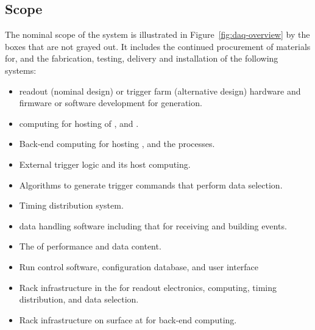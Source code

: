 \subsection{Scope}
\label{sec:fd-daq-scope}


The nominal scope of the  system is illustrated in
Figure~\ref{fig:daq-overview} by the boxes that are not grayed out. It 
includes the continued procurement of materials for, and the
fabrication, testing, delivery and installation of the following
systems:

\begin{itemize}
\item {} readout (nominal design) or trigger farm (alternative
  design) hardware and firmware or software development for
   generation.
\item {} computing for hosting of ,  and .
\item Back-end computing for hosting ,  and the  processes.
\item External trigger logic and its host computing.
\item Algorithms to generate trigger commands that perform data selection.
\item Timing distribution system.
\item {} data handling software including that for receiving and building 
  events.
\item The  of  performance and data content.
\item Run control software, configuration database, and user interface
\item Rack infrastructure in the  for readout
  electronics,  computing, timing distribution, and data
  selection.
\item Rack infrastructure on surface at \surf for back-end computing.
\end{itemize}

